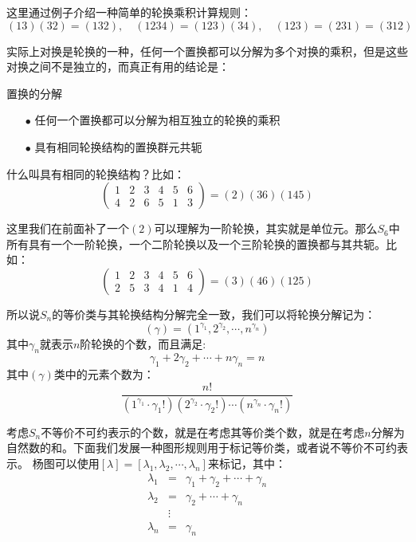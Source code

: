 这里通过例子介绍一种简单的轮换乘积计算规则：
\[(13)(32)=(132),\quad (1234)=(123)(34),\quad (123)=(231)=(312)\]

实际上对换是轮换的一种，任何一个置换都可以分解为多个对换的乘积，但是这些对换之间不是独立的，而真正有用的结论是：
\begin{theorem}{置换的分解}
	\begin{itemize}
		\item [$\bullet$] 任何一个置换都可以分解为相互独立的轮换的乘积
		\item [$\bullet$]具有相同轮换结构的置换群元共轭
	\end{itemize}
\end{theorem}

什么叫具有相同的轮换结构？比如：
\begin{equation}
	\begin{pmatrix}
		1&2  & 3&4&5 &6 \\
		4& 2 & 6&5&1&3 
	\end{pmatrix}=(2)(36)(145)
\end{equation}

这里我们在前面补了一个$(2)$可以理解为一阶轮换，其实就是单位元。那么$S_6$中所有具有一个一阶轮换，一个二阶轮换以及一个三阶轮换的置换都与其共轭。比如：
\begin{equation}
	\begin{pmatrix}
		1&2  & 3&4&5 &6 \\
		2& 5 & 3&4&1&4 
	\end{pmatrix}=(3)(46)(125)
\end{equation}

所以说$S_n$的等价类与其轮换结构分解完全一致，我们可以将轮换分解记为：
\[(\gamma)=\left(1^{\gamma_1},2^{\gamma_2},\cdots,n^{\gamma_n}\right)\]
其中$\gamma_n$就表示$n$阶轮换的个数，而且满足:
\[\gamma_1+2\gamma_2+\cdots+n\gamma_n=n\]
其中$(\gamma)$类中的元素个数为：
\[\frac{n!}{(1^{\gamma_1}\cdot\gamma_1!)(2^{\gamma_2}\cdot\gamma_2!)\cdots (n^{\gamma_n}\cdot\gamma_n!)}\]

考虑$S_n$不等价不可约表示的个数，就是在考虑其等价类个数，就是在考虑$n$分解为自然数的和。下面我们发展一种图形规则用于标记等价类，或者说不等价不可约表示。
杨图可以使用$[\lambda]=\left[\lambda_{1},\lambda_{2},\cdots,\lambda_n\right]$来标记，其中：
\begin{equation}
	\begin{aligned}
		\lambda_{1}&=&\gamma_1+\gamma_2+\cdots+\gamma_n\\
		\lambda_{2}&=&\gamma_2+\cdots+\gamma_n\\
		&\vdots&\\
		\lambda_n&=&\gamma_n
	\end{aligned}
\end{equation}

